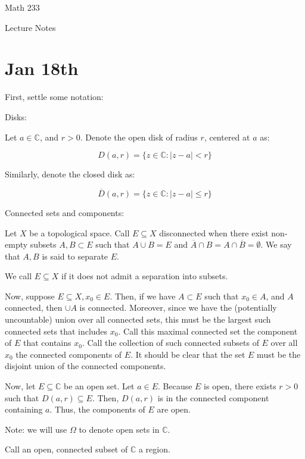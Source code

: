 \documentclass[10pt]{article}
\begin{document}
\begin{Large}
\centerline{Math 233}
\centerline{Lecture Notes}  %
\centerline{\bf }       %
\centerline{}      %
\end{Large}


\vspace{2em}
\section*{Jan 18th}

First, settle some notation:

Disks:

Let $ a \in \mathbb{C}$, and $r > 0$. Denote the open disk of radius $r$, centered at $a$ as:

$$ D(a,r) = \{ z \in \mathbb{C} : | z - a | < r \}$$

Similarly, denote the closed disk as:

$$ \overline{D}(a,r) =  \{ z \in \mathbb{C} : | z - a | \leq r \}$$

Connected sets and components:

Let $X$ be a topological space. Call $E \subseteq X$ disconnected when there exist non-empty subsets $A,B \subset E$ such that $A\cup B = E$ and $\overline{A} \cap B = A \cap \overline{B} = \emptyset$. We say that $A,B$ is said to separate $E$.

We call $E \subseteq X$ if it does not admit a separation into subsets.

Now, suppose $E \subseteq X, x_0 \in E$. Then, if we have $A \subset E$ such that $x_0 \in A$, and $A$ connected, then $\cup A$ is connected. Moreover, since we have the (potentially uncountable) union over all connected sets, this must be the largest such connected sets that includes $x_0$. Call this maximal connected set the component of $E$ that contains $x_0$. Call the collection of such connected subsets of $E$ over all $x_0$ the connected components of $E$. It should be clear that the set $E$ must be the disjoint union of the connected components.

Now, let $E \subseteq \mathbb{C}$ be an open set. Let $a \in E$. Because $E$ is open, there exists $r > 0$ such that $D(a,r) \subseteq E$. Then, $D(a,r)$ is in the connected component containing $a$. Thus, the components of $E$ are open.

Note: we will use $\Omega$ to denote open sets in $\mathbb{C}$.

Call an open, connected subset of $\mathbb{C}$ a region.
\end{document}
